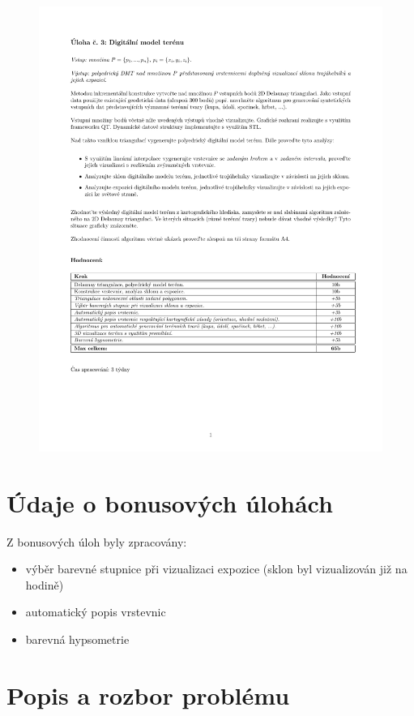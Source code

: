 \documentclass[a4paper, 12pt]{article}
\begin{document}
\begin{figure}[h!]
	\includegraphics[clip, trim=0cm 5cm 0cm 3cm, width=1.0\textwidth]{zadani.pdf}
\end{figure}


\section{Údaje o bonusových úlohách}
Z bonusových úloh byly zpracovány:
\begin{itemize}
	\item výběr barevné stupnice při vizualizaci expozice (sklon byl vizualizován již na hodině)
	\item automatický popis vrstevnic
	\item barevná hypsometrie
\end{itemize}



\clearpage

\section{Popis a rozbor problému}
\end{document}
